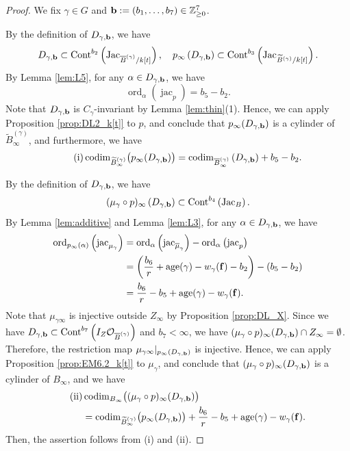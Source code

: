 \documentclass[a4paper,11pt]{amsart}
\theoremstyle{definition}
\theoremstyle{remark}
\begin{document}
\begin{proof}
We fix $\gamma \in G$ and ${\bf b} := (b_1, \ldots, b_7) \in \mathbb{Z}_{\ge 0} ^7$. 

By the definition of $D_{\gamma, {\bf b}}$, we have 
\[
D_{\gamma, {\bf b}} \subset 
\operatorname{Cont} ^{b_2} \left( \operatorname{Jac}_{\overline{B}^{(\gamma)}/k[t]} \right), \quad 
p_{\infty}\left( D_{\gamma, {\bf b}} \right) \subset 
\operatorname{Cont} ^{b_3} \left( \operatorname{Jac}_{\widetilde{B}^{(\gamma)}/k[t]} \right). 
\]
By Lemma \ref{lem:L5}, for any $\alpha \in D_{\gamma, {\bf b}}$, we have 
\[
\operatorname{ord}_{\alpha} (\operatorname{jac}_p) = b_5 - b_2. 
\]
Note that $D_{\gamma, {\bf b}}$ is $C_{\gamma}$-invariant by Lemma \ref{lem:thin}(1). 
Hence, we can apply Proposition \ref{prop:DL2_k[t]} to $p$, and conclude that $p_{\infty}(D_{\gamma, {\bf b}})$ is a cylinder of $\widetilde{B}^{(\gamma)} _{\infty}$, and furthermore, we have 
\[\tag{i}
\operatorname{codim}_{\widetilde{B}^{(\gamma)} _{\infty}} \bigl( p_{\infty}(D_{\gamma, {\bf b}}) \bigr) = 
\operatorname{codim}_{\overline{B}^{(\gamma)} _{\infty}} \left( D_{\gamma, {\bf b}} \right) + b_5 - b_2. 
\]


By the definition of $D_{\gamma, {\bf b}}$, we have 
\[
(\mu _{\gamma} \circ p)_{\infty} \left( D_{\gamma, {\bf b}} \right) \subset 
\operatorname{Cont} ^{b_4} \left( \operatorname{Jac}_{B} \right). 
\]
By Lemma \ref{lem:additive} and Lemma \ref{lem:L3}, 
for any $\alpha \in D_{\gamma, {\bf b}}$, we have 
\begin{align*}
\operatorname{ord}_{p_{\infty} (\alpha)} \left( \operatorname{jac}_{\mu _{\gamma}} \right)
&= \operatorname{ord}_{\alpha} \left( \operatorname{jac}_{\overline{\mu} _{\gamma}} \right) - \operatorname{ord}_{\alpha} \left( \operatorname{jac}_{p} \right)\\
&= \left(\frac{b_6}{r} + \operatorname{age}(\gamma) - w_\gamma({\bf f}) - b_2 \right) - (b_5 - b_2)\\
& = \frac{b_6}{r} - b_5 + \operatorname{age}(\gamma) - w_\gamma({\bf f}). 
\end{align*}
Note that $\mu _{\gamma \infty}$ is injective outside $Z_{\infty}$ by Proposition \ref{prop:DL_X}. 
Since we have $D_{\gamma, {\bf b}} \subset \operatorname{Cont}^{b_7} \left( I_Z \mathcal{O}_{\overline{B}^{(\gamma)}} \right)$ and $b_7 < \infty$, 
we have $(\mu _{\gamma} \circ p)_{\infty}(D_{\gamma, {\bf b}}) \cap Z_{\infty} = \emptyset$. 
Therefore, the restriction map $\mu _{\gamma \infty} |_{p_{\infty} (D_{\gamma, {\bf b}})}$ is injective. 
Hence, we can apply Proposition \ref{prop:EM6.2_k[t]} to $\mu _{\gamma}$, and conclude that $(\mu _{\gamma} \circ p)_{\infty}(D_{\gamma, {\bf b}})$ is a cylinder of $B_{\infty}$, and 
we have 
\begin{align*}\tag{ii}
&\operatorname{codim} _{B_{\infty}} \bigl( (\mu _{\gamma} \circ p)_{\infty}(D_{\gamma, {\bf b}}) \bigr) \\
& = \operatorname{codim} _{\widetilde{B}^{(\gamma)} _{\infty}} \bigl( p_{\infty} (D_{\gamma, {\bf b}}) \bigr) + \frac{b_6}{r} - b_5 + \operatorname{age}(\gamma) - w_\gamma({\bf f}).
\end{align*}
Then, the assertion follows from (i) and (ii). 
\end{proof}
\end{document}
